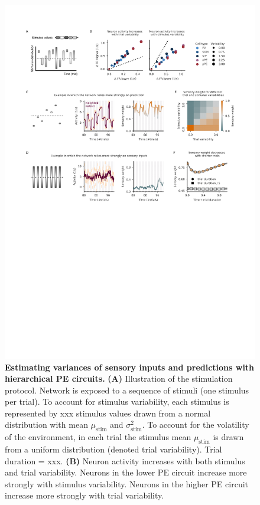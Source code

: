 \documentclass[10pt,a4paper]{article}
\begin{document}
\begin{figure}[t!]
	\centering
    \includegraphics[width=1\linewidth]{../results/figures/final/Fig_3}
\caption{\footnotesize{\bf Estimating variances of sensory inputs and predictions with hierarchical PE circuits.\newline} 
{\bf (A)} Illustration of the stimulation protocol. Network is exposed to a sequence of stimuli (one stimulus per trial). To account for stimulus variability, each stimulus is represented by xxx stimulus values drawn from a normal distribution with mean $\mu_\mathrm{stim}$ and $\sigma_\mathrm{stim}^2$. To account for the volatility of the environment, in each trial the stimulus mean $\mu_\mathrm{stim}$ is drawn from a uniform distribution (denoted trial variability). Trial duration = xxx. 
{\bf (B)} Neuron activity increases with both stimulus and trial variability. Neurons in the lower PE circuit increase more strongly with stimulus variability. Neurons in the higher PE circuit increase more strongly with trial variability.
}
\end{figure}
\end{document}
